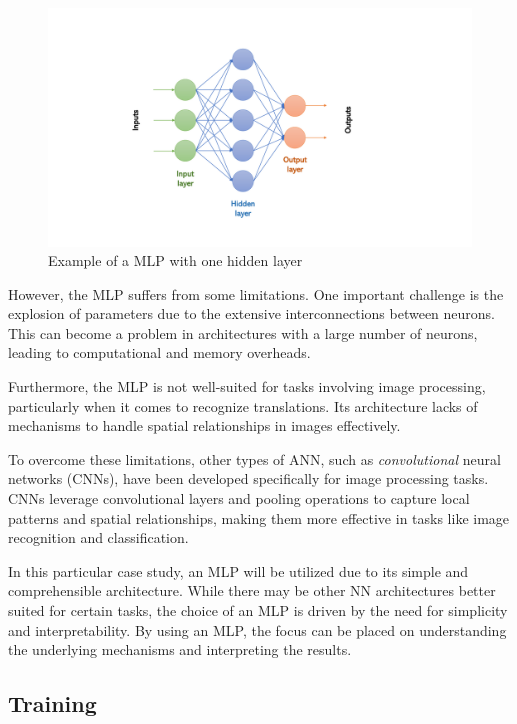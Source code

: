 \begin{figure}[h]
	\centering
	\includegraphics[width=1\linewidth]{ImageFiles/NeuralNetworks/mlp}
	\caption{Example of a MLP with one hidden layer}
	\label{fig:mlp}
\end{figure}

However, the MLP suffers from some limitations. One important challenge is the explosion of parameters due to the extensive interconnections between neurons. This can become a problem in architectures with a large number of neurons, leading to computational and memory overheads.

Furthermore, the MLP is not well-suited for tasks involving image processing, particularly when it comes to recognize translations. Its architecture lacks of mechanisms to handle spatial relationships in images effectively.

To overcome these limitations, other types of ANN, such as \textit{convolutional} neural networks (CNNs), have been developed specifically for image processing tasks. CNNs leverage convolutional layers and pooling operations to capture local patterns and spatial relationships, making them more effective in tasks like image recognition and classification.

In this particular case study, an MLP will be utilized due to its simple and comprehensible architecture. While there may be other NN architectures better suited for certain tasks, the choice of an MLP is driven by the need for simplicity and interpretability. By using an MLP, the focus can be placed on understanding the underlying mechanisms and interpreting the results.

\subsection{Training}

